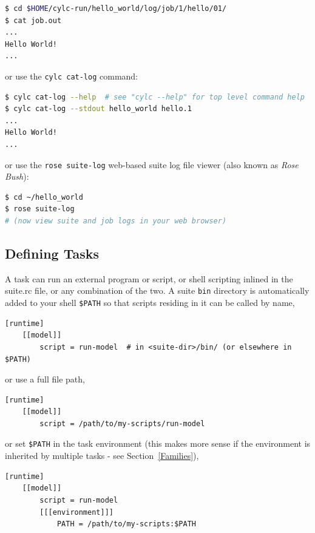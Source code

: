 \begin{shaded*}
\begin{lstlisting}[language=bash]
$ cd $HOME/cylc-run/hello_world/log/job/1/hello/01/
$ cat job.out
...
Hello World!
...
\end{lstlisting}

or use the \lstinline{cylc cat-log} command:

\begin{lstlisting}[language=bash]
$ cylc cat-log --help  # see "cylc --help" for top level command help
$ cylc cat-log --stdout hello_world hello.1
...
Hello World!
...
\end{lstlisting}

or use the \lstinline{rose suite-log} web-based suite log file viewer (also known as {\em Rose Bush}):

\begin{lstlisting}[language=bash]
$ cd ~/hello_world
$ rose suite-log
# (now view suite and job logs in your web browser)
\end{lstlisting}

\end{shaded*}

\subsection{Defining Tasks}

A task can run an external program or script, or shell scripting
inlined in the suite.rc file, or any combination of the two.  A suite
\lstinline{bin} directory is automatically added to your shell
\lstinline{$PATH} so that scripts residing in it can be called by name,

\begin{lstlisting}[language=suiterc]
[runtime]
    [[model]]
        script = run-model  # in <suite-dir>/bin/ (or elsewhere in $PATH)
\end{lstlisting}

or use a full file path,

\begin{lstlisting}[language=suiterc]
[runtime]
    [[model]]
        script = /path/to/my-scripts/run-model
\end{lstlisting}

or set \lstinline{$PATH} in the task environment (this makes more sense
if the environment is inherited by multiple tasks - see
Section~\ref{Families}),
\begin{lstlisting}[language=suiterc]
[runtime]
    [[model]]
        script = run-model
        [[[environment]]]
            PATH = /path/to/my-scripts:$PATH
\end{lstlisting}

